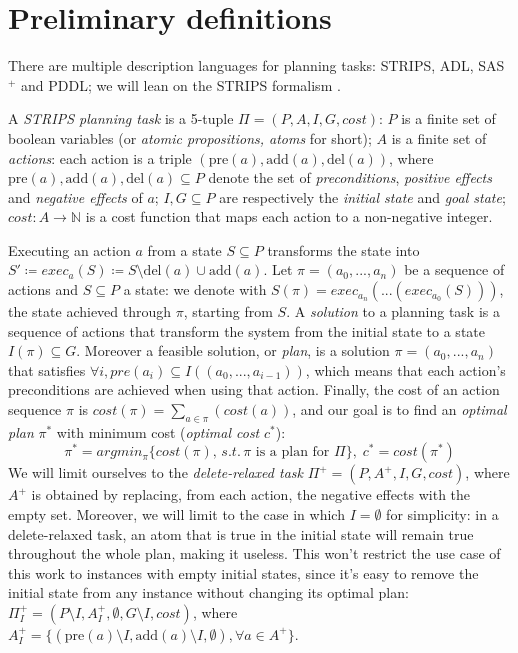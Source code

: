 \section{Preliminary definitions}
There are multiple description languages for planning tasks: STRIPS, ADL, SAS$^+$ and PDDL; we will lean on the STRIPS formalism \cite{Fikes_71}.

A \textit{STRIPS planning task} is a 5-tuple $\Pi=(P,A,I,G,cost)$: $P$ is a finite set of boolean variables (or \textit{atomic propositions, atoms} for short); $A$ is a finite set of \textit{actions}: each action is a triple $(\mbox{pre}(a), \mbox{add}(a), \mbox{del}(a))$, where $\mbox{pre}(a),\mbox{add}(a),\mbox{del}(a)\subseteq P$ denote the set of \textit{preconditions}, \textit{positive effects} and \textit{negative effects} of $a$; $I,G\subseteq P$ are respectively the \textit{initial state} and \textit{goal state}; $cost:A\to\mathbb{N}$ is a cost function that maps each action to a non-negative integer.

Executing an action $a$ from a state $S\subseteq P$ transforms the state into $S'\coloneq exec_a(S)\coloneq S\setminus \mbox{del}(a)\cup \mbox{add}(a)$.
Let $\pi=(a_0,...,a_n)$ be a sequence of actions and $S\subseteq P$ a state: we denote with $S(\pi)=exec_{a_n}(...(exec_{a_0}(S)))$, the state achieved through $\pi$, starting from $S$.
A \textit{solution} to a planning task is a sequence of actions that transform the system from the initial state to a state $I(\pi)\subseteq G$. Moreover a feasible solution, or \textit{plan}, is a solution $\pi=(a_0,...,a_n)$ that satisfies $\forall i,pre(a_i)\subseteq I((a_0,...,a_{i-1}))$, which means that each action's preconditions are achieved when using that action. Finally, the cost of an action sequence $\pi$ is $cost(\pi)=\sum_{a\in\pi}(cost(a))$, and our goal is to find an \textit{optimal plan} $\pi^*$ with minimum cost (\textit{optimal cost} $c^*$): $$\pi^*=argmin_{\pi}\{{cost(\pi)},\,s.t.\,\pi\mbox{ is a plan for }\Pi\},\;c^*=cost(\pi^*)$$
We will limit ourselves to the \textit{delete-relaxed task} $\Pi^+=(P,A^+,I,G,cost)$, where $A^+$ is obtained by replacing, from each action, the negative effects with the empty set. Moreover, we will limit to the case in which $I=\emptyset$ for simplicity: in a delete-relaxed task, an atom that is true in the initial state will remain true throughout the whole plan, making it useless. This won't restrict the use case of this work to instances with empty initial states, since it's easy to remove the initial state from any instance without changing its optimal plan: $\Pi^+_I=(P\setminus I, A^+_{I}, \emptyset, G\setminus I, cost)$, where $A^+_I=\{(\mbox{pre}(a)\setminus I, \mbox{add}(a)\setminus I, \emptyset),\forall a\in A^+\}$.
